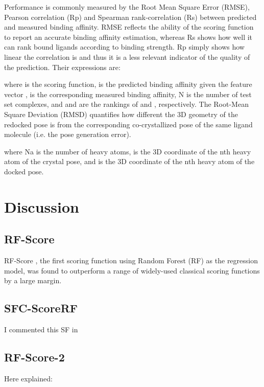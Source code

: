 \documentclass{llncs}
\begin{document}

Performance is commonly measured \cite{1313} by the Root Mean Square Error (RMSE), Pearson correlation (Rp) and Spearman rank-correlation (Rs) between predicted and measured binding affinity. RMSE reflects the ability of the scoring function to report an accurate binding affinity estimation, whereas Rs shows how well it can rank bound ligands according to binding strength. Rp simply shows how linear the correlation is and thus it is a less relevant indicator of the quality of the prediction. Their expressions are:


where  is the scoring function,  is the predicted binding affinity given the feature vector ,  is the corresponding measured binding affinity, N is the number of test set complexes, and  and  are the rankings of  and , respectively. 
The Root-Mean Square Deviation (RMSD) quantifies how different the 3D geometry of the redocked pose is from the corresponding co-crystallized pose of the same ligand molecule (i.e. the pose generation error). 

where Na is the number of heavy atoms,  is the 3D coordinate of the nth heavy atom of the crystal pose, and  is the 3D coordinate of the nth heavy atom of the docked pose.

\section{Discussion}

\subsection{RF-Score}

RF-Score \cite{564}, the first scoring function using Random Forest (RF) \cite{1309} as the regression model, was found to outperform a range of widely-used classical scoring functions by a large margin.

\subsection{SFC-ScoreRF}

I commented this SF in \cite{1370}

\subsection{RF-Score-2}

Here explained: \cite{1370}
\end{document}
